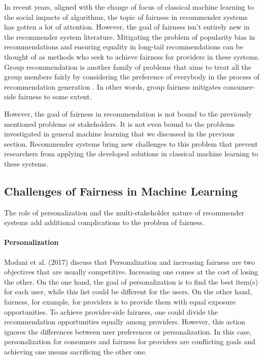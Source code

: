     In recent years, aligned with the change of focus of classical machine learning to the social impacts of algorithms, the topic of fairness in recommender systems has gotten a lot of attention. However, the goal of fairness isn't entirely new in the recommender system literature. Mitigating the problem of popularity bias in recommendations \cite{popbias2018} and ensuring equality in long-tail recommendations \cite{ferraro2019} can be thought of as methods who seek to achieve fairness for providers in these systems. Group recommendation is another family of problems that aims to treat all the group members fairly by considering the preference of everybody in the process of recommendation generation \cite{kaya2020}. In other words, group fairness mitigates consumer-side fairness to some extent. 
    
    However, the goal of fairness in recommendation is not bound to the previously mentioned problems or stakeholders. It is not even bound to the problems investigated in general machine learning that we discussed in the previous section. Recommender systems bring new challenges to this problem that prevent researchers from applying the developed solutions in classical machine learning to these systems. 

    \subsection{Challenges of Fairness in Machine Learning}
        The role of personalization and the multi-stakeholder nature of recommender systems add additional complications to the problem of fairness.
        
        \vspace{0.25cm}
        \noindent \paragraph{Personalization}
        \vspace{0.25cm}
    
            Modani et al. (2017) \cite{modani2017fairness} discuss that Personalization and increasing fairness are two objectives that are usually competitive. Increasing one comes at the cost of losing the other. On the one hand, the goal of personalization is to find the best item(s) for each user, while this list could be different for the users. On the other hand, fairness, for example, for providers is to provide them with equal exposure opportunities. To achieve provider-side fairness, one could divide the recommendation opportunities equally among providers. However, this action ignores the differences between user preferences or personalization. In this case, personalization for consumers and fairness for providers are conflicting goals and achieving one means sacrificing the other one.
            
